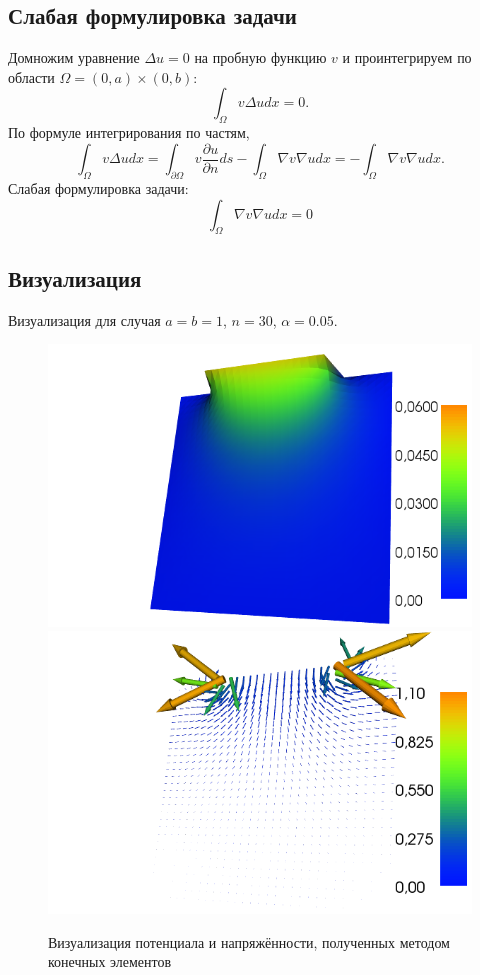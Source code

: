 \documentclass{report}
\begin{document}
\subsection{Слабая формулировка задачи}
Домножим уравнение $\Delta u = 0$ на пробную функцию $v$ и проинтегрируем по области $\Omega = (0,a)\times(0,b)$:
\begin{equation}
	\int_{\Omega}v \Delta u dx=0.
\end{equation}
По формуле интегрирования по частям,
\begin{equation}
	\int_{\Omega}v \Delta u dx=\int_{\partial \Omega}v\frac{\partial u}{\partial n}ds-\int_{\Omega}\nabla v\nabla u dx=-\int_{\Omega}\nabla v \nabla u dx.
\end{equation}
Слабая формулировка задачи:
\begin{equation}\label{weak_form}
	\int_{\Omega} \nabla v \nabla u dx=0
\end{equation}

\subsection{Визуализация}
Визуализация для случая $a=b=1$, $n=30$, $\alpha = 0.05$.
\begin{figure}[t]
	\includegraphics[scale=0.4]{dolfin_plot_0.png}
	\includegraphics[scale=0.4]{dolfin_plot_1.png}
	\caption{Визуализация потенциала и напряжённости, полученных методом конечных элементов}
	\centering
\end{figure}
\end{document}
